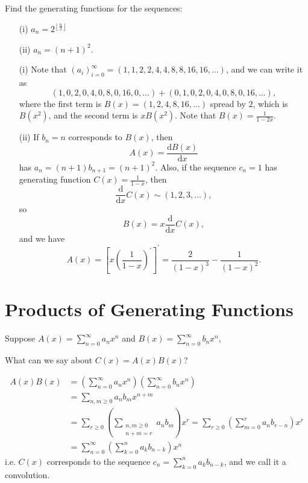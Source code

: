\begin{eg}
    Find the generating functions for the sequences:
    \begin{itemize}
        \item [(i)] \(a_n = 2^{\left\lfloor \frac{n}{2} \right\rfloor}\)
        \item [(ii)] \(a_n = (n + 1)^2\). 
    \end{itemize}
\end{eg}
\begin{explanation}
    \vphantom{text}
    \begin{itemize}
        \item [(i)] Note that \((a_i)_{i=0}^{\infty} = (1, 1, 2, 2, 4, 4, 8, 8, 16, 16, \dots )\), and we can write it as 
        \[
            (1,0,2,0,4,0,8,0,16,0,\dots ) + (0, 1, 0, 2, 0, 4,0, 8, 0, 16,\dots ),
        \] where the first term is \(B(x) = (1, 2, 4, 8, 16, \dots )\) spread by \(2\), which is \(B \left( x^2 \right) \), and the second term is \(x B \left( x^2 \right) \). Note that \(B(x) = \frac{1}{1 - 2x}\).  
        \item [(ii)] If \(b_n = n\) corresponds to \(B(x)\), then 
        \[
            A(x) = \frac{\mathrm{d}B(x)}{\mathrm{d}x} 
        \] has \(a_n = (n + 1) b_{n+1} = (n+1)^2\). Also, if the sequence \(c_n = 1\) has generating function \(C(x) = \frac{1}{1-x}\), then 
        \[
            \frac{\mathrm{d}}{\mathrm{d}x} C(x) \sim (1,2,3, \dots ),
        \] so 
        \[
           B(x) = x \frac{\mathrm{d}}{\mathrm{d}x} C(x),
        \]
        and we have 
        \[
            A(x) = \left[ x \left( \frac{1}{1 - x} \right)^{\prime}   \right]^{\prime} = \frac{2}{(1-x)^3} - \frac{1}{(1-x)^2}. 
        \]  
    \end{itemize}
\end{explanation}

\section{Products of Generating Functions}
Suppose \(A(x) = \sum_{n=0}^{\infty} a_n x^n \) and \(B(x) = \sum_{n=0}^{\infty}  b_n x^n \),
\begin{question}
    What can we say about \(C(x) = A(x) B(x)\)?  
\end{question}
\begin{align*}
    A(x) B(x) &= \left( \sum_{n=0}^{\infty} a_n x^n  \right) \left( \sum_{n=0}^{\infty} b_n x^n  \right) \\
    &= \sum_{n, m \ge 0} a_n b_m x^{n + m} \\
    &= \sum_{r \ge 0} \left( \sum_{\substack{n, m \ge 0 \\ n + m = r}} a_n b_m  \right) x^r = \sum_{r \ge 0} \left( \sum_{m=0}^r a_n b_{r - n}  \right) x^r \\
    &= \sum_{n=0}^{\infty} \left( \sum_{k=0}^n a_k b_{n - k}  \right) x^n        
\end{align*} 
i.e. \(C(x)\) corresponds to the sequence \(c_n = \sum_{k=0}^n a_k b_{n - k} \), and we call it a convolution. 

